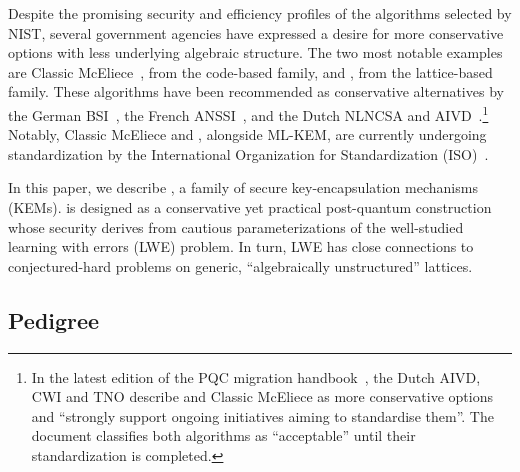 Despite the promising security and efficiency profiles of the algorithms selected by NIST, several government agencies have expressed a desire for more conservative options with less underlying algebraic structure.
The two most notable examples are Classic McEliece~\cite{CME}, from the code-based family, and \FrodoKEM, from the lattice-based family.
These algorithms have been recommended as conservative alternatives by the German BSI~\cite{BSI}, the French ANSSI~\cite{ANSSI}, and the Dutch NLNCSA and AIVD~\cite{AIVD}.\footnote{In the latest edition of the PQC migration handbook~\cite{Dutch_HB}, the Dutch AIVD, CWI and TNO describe \FrodoKEM and Classic McEliece as more conservative options and ``strongly support ongoing initiatives aiming to standardise them''.
  The document classifies both algorithms as ``acceptable'' until their standardization is completed.}
Notably, Classic McEliece and \FrodoKEM, alongside ML-KEM, are currently undergoing standardization by the International Organization for Standardization (ISO)~\cite{ISO}.


In this paper, we describe \FrodoKEM, a family of \INDCCA secure key-encapsulation mechanisms (KEMs).
\FrodoKEM is designed as a conservative yet practical post-quantum construction whose security derives from cautious parameterizations of the well-studied learning with errors (LWE) problem.
In turn, LWE has close connections to conjectured-hard problems on generic, “algebraically unstructured” lattices.


\subsection{Pedigree}

